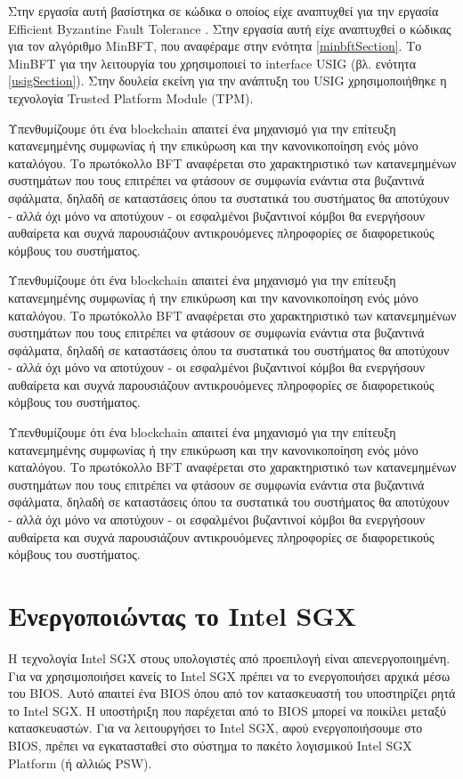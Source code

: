Στην εργασία αυτή βασίστηκα σε κώδικα ο οποίος είχε αναπτυχθεί για την εργασία Efficient Byzantine Fault Tolerance \cite{minbftsystem}. Στην εργασία αυτή είχε αναπτυχθεί ο κώδικας για τον αλγόριθμο MinBFT, που αναφέραμε στην  ενότητα \ref{minbftSection}. Το MinBFT για την λειτουργία του χρησιμοποιεί το interface USIG (βλ. ενότητα \ref{usigSection}). Στην δουλεία εκείνη για την ανάπτυξη του USIG χρησιμοποιήθηκε η τεχνολογία Trusted Platform Module (TPM).

Υπενθυμίζουμε ότι ένα blockchain απαιτεί ένα μηχανισμό για την επίτευξη κατανεμημένης συμφωνίας ή την επικύρωση και την κανονικοποίηση ενός μόνο καταλόγου. Το πρωτόκολλο BFT αναφέρεται στο χαρακτηριστικό των κατανεμημένων συστημάτων που τους επιτρέπει να φτάσουν σε συμφωνία ενάντια στα βυζαντινά σφάλματα, δηλαδή σε καταστάσεις όπου τα συστατικά του συστήματος θα αποτύχουν - αλλά όχι μόνο να αποτύχουν - οι εσφαλμένοι βυζαντινοί κόμβοι θα ενεργήσουν αυθαίρετα και συχνά παρουσιάζουν αντικρουόμενες πληροφορίες σε διαφορετικούς κόμβους του συστήματος.

Υπενθυμίζουμε ότι ένα blockchain απαιτεί ένα μηχανισμό για την επίτευξη κατανεμημένης συμφωνίας ή την επικύρωση και την κανονικοποίηση ενός μόνο καταλόγου. Το πρωτόκολλο BFT αναφέρεται στο χαρακτηριστικό των κατανεμημένων συστημάτων που τους επιτρέπει να φτάσουν σε συμφωνία ενάντια στα βυζαντινά σφάλματα, δηλαδή σε καταστάσεις όπου τα συστατικά του συστήματος θα αποτύχουν - αλλά όχι μόνο να αποτύχουν - οι εσφαλμένοι βυζαντινοί κόμβοι θα ενεργήσουν αυθαίρετα και συχνά παρουσιάζουν αντικρουόμενες πληροφορίες σε διαφορετικούς κόμβους του συστήματος.

Υπενθυμίζουμε ότι ένα blockchain απαιτεί ένα μηχανισμό για την επίτευξη κατανεμημένης συμφωνίας ή την επικύρωση και την κανονικοποίηση ενός μόνο καταλόγου. Το πρωτόκολλο BFT αναφέρεται στο χαρακτηριστικό των κατανεμημένων συστημάτων που τους επιτρέπει να φτάσουν σε συμφωνία ενάντια στα βυζαντινά σφάλματα, δηλαδή σε καταστάσεις όπου τα συστατικά του συστήματος θα αποτύχουν - αλλά όχι μόνο να αποτύχουν - οι εσφαλμένοι βυζαντινοί κόμβοι θα ενεργήσουν αυθαίρετα και συχνά παρουσιάζουν αντικρουόμενες πληροφορίες σε διαφορετικούς κόμβους του συστήματος.

\section{Ενεργοποιώντας το Intel SGX}
Η τεχνολογία Intel SGX στους υπολογιστές από προεπιλογή είναι απενεργοποιημένη. Για να χρησιμοποιήσει κανείς το Intel SGX πρέπει να το ενεργοποιήσει αρχικά μέσω του BIOS. Αυτό απαιτεί ένα BIOS όπου από τον κατασκευαστή του υποστηρίζει ρητά το Intel SGX. Η υποστήριξη που παρέχεται από το BIOS μπορεί να ποικίλει μεταξύ κατασκευαστών. Για να λειτουργήσει το Intel SGX, αφού ενεργοποιήσουμε στο BIOS, πρέπει να εγκατασταθεί στο σύστημα το πακέτο λογισμικού Intel SGX Platform (ή αλλιώς PSW)\cite{linuxsgx}. 

